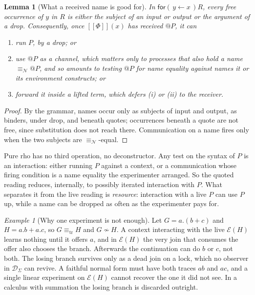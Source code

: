 \documentclass[11pt]{article}
\makeatletter
\theoremstyle{definition}
\theoremstyle{plain}
\newtheorem{lemma}[definition]{Lemma}
\theoremstyle{remark}
\newtheorem{example}[definition]{Example}
\newcommand{\quo}[1]{@#1}
\newcommand{\inp}[3]{\mathsf{for}(\,#1 \leftarrow #2\,)#3}
\newcommand{\enc}[1]{[\![#1]\!]}
\newcommand{\nequiv}{\equiv_{\mathcal{N}}}
\newcommand{\Obs}{\mathcal{D}}
\newcommand{\sbisim}{\sim}
\newcommand{\treq}{\equiv_{\mathrm{tr}}}
\makeatother
\begin{document}
\begin{lemma}[What a received name is good for]\label{lem:uses}
In $\inp{y}{x}{R}$, every free occurrence of $y$ in $R$ is either the
subject of an input or output or the argument of a drop. Consequently,
once $\enc{\Phi}(x)$ has received $\quo{P}$, it can
\begin{enumerate}[label=(\roman*),leftmargin=2.2em,nosep]
\item run $P$, by a drop; or
\item use $\quo{P}$ as a channel, which matters only to processes that
also hold a name $\nequiv \quo{P}$, and so amounts to testing $\quo{P}$
for name equality against names it or its environment constructs; or
\item forward it inside a lifted term, which defers (i) or (ii) to the
receiver.
\end{enumerate}
\end{lemma}

\begin{proof}
By the grammar, names occur only as subjects of input and output, as
binders, under drop, and beneath quotes; occurrences beneath a quote are
not free, since substitution does not reach there. Communication on a name fires only when the two
subjects are $\nequiv$-equal.
\end{proof}

Pure rho has no third operation, no deconstructor. Any test on the syntax
of $P$ is an interaction: either running $P$ against a context, or a
communication whose firing condition is a name equality the experimenter
arranged. So the quoted reading reduces, internally, to possibly iterated
interaction with $P$. What separates it from the live reading is
\emph{resource}: interaction with a live $P$ can use $P$ up, while a name
can be dropped as often as the experimenter pays for.

\begin{example}[Why one experiment is not enough]\label{ex:linear}
Let $G = a.(b + c)$ and $H = a.b + a.c$, so $G \treq H$ and $G \not\sbisim
H$. A context interacting with the live $\mathcal{E}(H)$ learns nothing
until it offers $a$, and in $\mathcal{E}(H)$ the very join that consumes
the offer also chooses the branch. Afterwards the continuation can do $b$
or $c$, not both. The losing branch survives only as a dead join on a
lock, which no observer in $\Obs_\Sigma$ can revive. A faithful normal
form must have both traces $ab$ and $ac$, and a single linear experiment
on $\mathcal{E}(H)$ cannot recover the one it did not see. In a calculus
with summation the losing branch is discarded outright.
\end{example}
\end{document}
